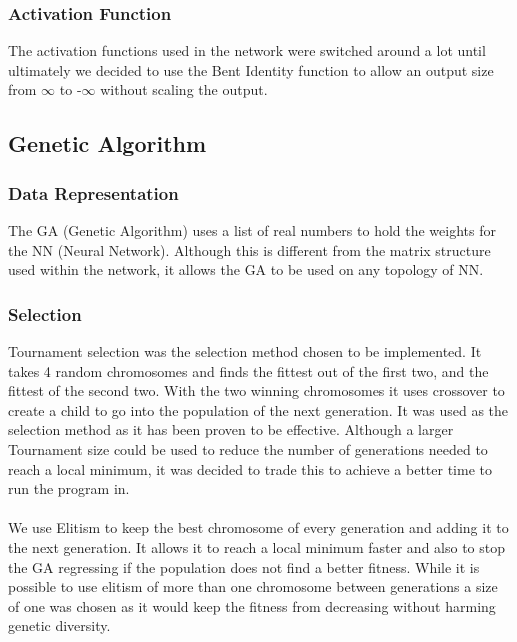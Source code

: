 \documentclass[12pt]{article}
\begin{document}
\subsubsection{Activation Function}
The activation functions used in the network were switched around a lot until ultimately we decided to use the Bent Identity function to allow an output size from $\infty$ to -$\infty$ without scaling the output. 

\subsection{Genetic Algorithm}
\subsubsection{Data Representation}
The GA (Genetic Algorithm) uses a list of real numbers to hold the weights for the NN (Neural Network). Although this is different from the matrix structure used within the network, it allows the GA to be used on any topology of NN. 

\subsubsection{Selection}
Tournament selection was the selection method chosen to be implemented. It takes 4 random chromosomes and finds the fittest out of the first two, and the fittest of the second two. With the two winning chromosomes it uses crossover to create a child to go into the population of the next generation. It was used as the selection method as it has been proven to be effective\cite{FoundationsOfGA}\cite{GAComparison}. Although a larger Tournament size could be used to reduce the number of generations needed to reach a local minimum, it was decided to trade this to achieve a better time to run the program in.\\\\
We use Elitism to keep the best chromosome of every generation and adding it to the next generation. It allows it to reach a local minimum faster and also to stop the GA regressing if the population does not find a better fitness. While it is possible to use elitism of more than one chromosome between generations a size of one was chosen as it would keep the fitness from decreasing without harming genetic diversity.
\end{document}
